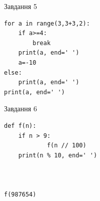 \documentclass[12pt, ukrainian]{article}
\begin{document}
{\vspace{15mm}
\begin{minipage}[t]{9.7cm}                
{\begin{center}Завдання {5}\end{center}}
\begin{verbatim}
for a in range(3,3+3,2):
    if a>=4:
        break
    print(a, end=' ')
    a=-10
else:
    print(a, end=' ')
print(a, end=' ')
\end{verbatim}     
\end{minipage}
\vline \hspace{8mm}
\begin{minipage}[t]{8.0cm}                
{\begin{center}Завдання {6}\end{center}}
\begin{verbatim}
def f(n):
    if n > 9:
            f(n // 100)
    print(n % 10, end=' ')
    


f(987654)
\end{verbatim}     
\end{minipage}

}
\newpage
\end{document}
